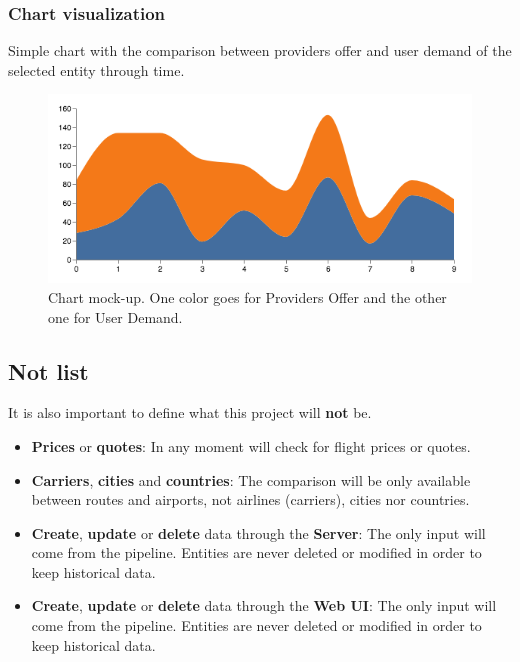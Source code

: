 \subsubsection*{Chart visualization} \label{chart_visualization}

Simple chart with the comparison between providers offer and user demand of the selected entity through time.

\begin{figure}[H]
\centering
\includegraphics[scale=0.4]{resources/stacked-chart-example01.png}
\caption{Chart mock-up. One color goes for Providers Offer and the other one for User Demand.}
\end{figure}

\subsection{Not list}

It is also important to define what this project will \textbf{not} be.

\begin{itemize}
  \item \textbf{Prices} or \textbf{quotes}: In any moment will check for flight prices or quotes.
  \item \textbf{Carriers}, \textbf{cities} and \textbf{countries}: The comparison will be only available between routes and airports, not airlines (carriers), cities nor countries.
  \item \textbf{Create}, \textbf{update} or \textbf{delete} data through the \textbf{Server}: The only input will come from the pipeline. Entities are never deleted or modified in order to keep historical data.
  \item \textbf{Create}, \textbf{update} or \textbf{delete} data through the \textbf{Web UI}: The only input will come from the pipeline. Entities are never deleted or modified in order to keep historical data.
\end{itemize}

